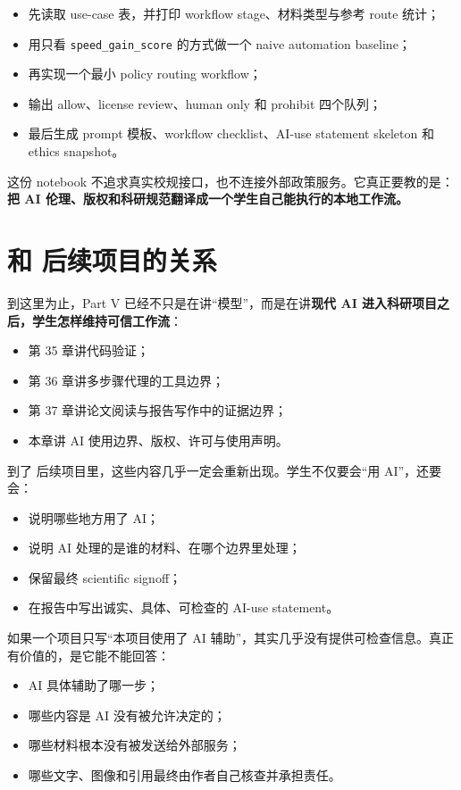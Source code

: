 \begin{itemize}
    \item 先读取 use-case 表，并打印 workflow stage、材料类型与参考 route 统计；
    \item 用只看 \texttt{speed\_gain\_score} 的方式做一个 naive automation baseline；
    \item 再实现一个最小 policy routing workflow；
    \item 输出 allow、license review、human only 和 prohibit 四个队列；
    \item 最后生成 prompt 模板、workflow checklist、AI-use statement skeleton 和 ethics snapshot。
\end{itemize}

这份 notebook 不追求真实校规接口，也不连接外部政策服务。它真正要教的是：\textbf{把 AI 伦理、版权和科研规范翻译成一个学生自己能执行的本地工作流。}

\section{和 后续项目的关系}

到这里为止，Part V 已经不只是在讲“模型”，而是在讲\textbf{现代 AI 进入科研项目之后，学生怎样维持可信工作流}：

\begin{itemize}
    \item 第 35 章讲代码验证；
    \item 第 36 章讲多步骤代理的工具边界；
    \item 第 37 章讲论文阅读与报告写作中的证据边界；
    \item 本章讲 AI 使用边界、版权、许可与使用声明。
\end{itemize}

到了 后续项目里，这些内容几乎一定会重新出现。学生不仅要会“用 AI”，还要会：

\begin{itemize}
    \item 说明哪些地方用了 AI；
    \item 说明 AI 处理的是谁的材料、在哪个边界里处理；
    \item 保留最终 scientific signoff；
    \item 在报告中写出诚实、具体、可检查的 AI-use statement。
\end{itemize}

如果一个项目只写“本项目使用了 AI 辅助”，其实几乎没有提供可检查信息。真正有价值的，是它能不能回答：

\begin{itemize}
    \item AI 具体辅助了哪一步；
    \item 哪些内容是 AI 没有被允许决定的；
    \item 哪些材料根本没有被发送给外部服务；
    \item 哪些文字、图像和引用最终由作者自己核查并承担责任。
\end{itemize}

